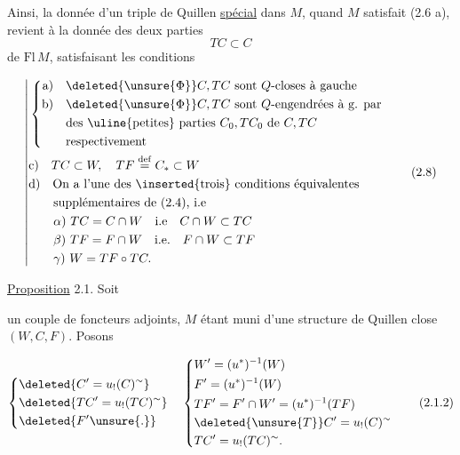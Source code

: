 Ainsi, la donnée d'un triple de Quillen
\uline{spécial} dans $M$,  quand $M$ satisfait (2.6 a),
revient à la donnée des deux parties 
\[
TC\subset C\tag*{(2.7)}
\]
de $\mathrm{Fl}\,M$, satisfaisant les conditions

\[
\left|\begin{aligned}
&\left\{\begin{aligned}
\text{a)}\quad &\deleted{\unsure{\Phi}}C,TC\text{ sont }Q\text{-closes à gauche}\\
\text{b)}\quad &\deleted{\unsure{\Phi}}C,TC\text{ sont }Q\text{-engendrées à g. par}\\
&\text{des \uline{petites} parties } C_0,TC_0\text{ de }C,TC\\
&\text{respectivement}
\end{aligned}\right.\\
&\text{c)}\quad TC\subset W,\quad TF\overset{\mathrm{def}}{=}C_*\subset W\\
&\text{d)}\quad\text{On a l'une des \inserted{trois} conditions équivalentes}\\
&\qquad\text{supplémentaires de (2.4), i.e}\\
&\qquad\alpha)\ TC=C\cap W\quad\text{i.e}\quad C\cap W\subset TC\\
&\qquad\beta)\ TF=F\cap W\quad\text{i.e.}\quad F\cap W\subset TF\\
&\qquad\gamma)\ W=TF\circ TC.
\end{aligned}\right.\tag*{(2.8)}
\]

\uline{Proposition} 2.1. Soit


un couple de foncteurs adjoints, $M$ étant
muni d'une structure de Quillen close
$(W,C,F)$. Posons

\[
\left\{\begin{aligned}
&\deleted{C'=u_!(C)^{\sim}}\\
&\deleted{TC'=u_!(TC)^{\sim}}\\
&\deleted{F'\unsure{.}}
\end{aligned}\right.\quad
\left\{\begin{aligned}
&W'=(u^*)^{-1}(W)\\
&F'=(u^*)^{-1}(W)\\
&TF'=F'\cap W'=(u^*)^{-1}(TF)\\
&\deleted{\unsure{T}}C'=u_!(C)^{\sim}\\
&TC'=u_!(TC)^{\sim}.
\end{aligned}\right.\tag*{(2.1.2)}
\]

